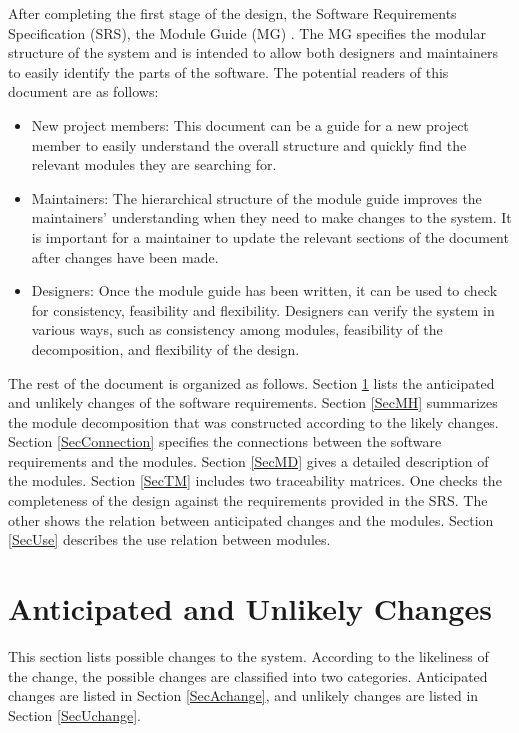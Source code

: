 \documentclass[12pt]{article}
\begin{document}
After completing the first stage of the design, the Software Requirements
Specification (SRS), the Module Guide (MG) . The MG
specifies the modular structure of the system and is intended to allow both
designers and maintainers to easily identify the parts of the software.  The
potential readers of this document are as follows:

\begin{itemize}
\item New project members: This document can be a guide for a new project member
  to easily understand the overall structure and quickly find the
  relevant modules they are searching for.
\item Maintainers: The hierarchical structure of the module guide improves the
  maintainers' understanding when they need to make changes to the system. It is
  important for a maintainer to update the relevant sections of the document
  after changes have been made.
\item Designers: Once the module guide has been written, it can be used to
  check for consistency, feasibility and flexibility. Designers can verify the
  system in various ways, such as consistency among modules, feasibility of the
  decomposition, and flexibility of the design.
\end{itemize}

The rest of the document is organized as follows. Section
\ref{SecChange} lists the anticipated and unlikely changes of the software
requirements. Section \ref{SecMH} summarizes the module decomposition that
was constructed according to the likely changes. Section \ref{SecConnection}
specifies the connections between the software requirements and the
modules. Section \ref{SecMD} gives a detailed description of the
modules. Section \ref{SecTM} includes two traceability matrices. One checks
the completeness of the design against the requirements provided in the SRS. The
other shows the relation between anticipated changes and the modules. Section
\ref{SecUse} describes the use relation between modules.

\section{Anticipated and Unlikely Changes} \label{SecChange}

This section lists possible changes to the system. According to the likeliness
of the change, the possible changes are classified into two
categories. Anticipated changes are listed in Section \ref{SecAchange}, and
unlikely changes are listed in Section \ref{SecUchange}.
\end{document}
